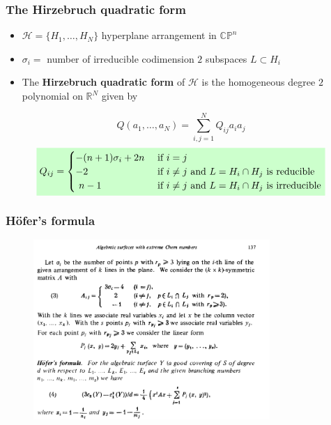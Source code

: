 \documentclass{beamer}
\newcommand{\R}{\mathbb{R}}
\newcommand{\CP}{\mathbb{CP}}
\newcommand{\mH}{\mathcal{H}}
\newcommand{\mathcolorbox}[2]{\colorbox{#1}{$\displaystyle #2$}}
\begin{document}
\begin{frame}
	\frametitle{The Hirzebruch quadratic form}
	\begin{itemize}
		\pause
		\item \(\mH = \{H_1, \ldots, H_N\}\) hyperplane arrangement in \(\CP^n\)
		\pause
		\item \(\sigma_i = \) number of irreducible codimension \(2\) subspaces \(L \subset H_i\)
		\pause
		\item The \textbf{Hirzebruch quadratic form} of \(\mH\) is the homogeneous degree \(2\) polynomial on \(\R^N\) given by
	\end{itemize}
	\[
	Q(a_1, \ldots, a_N) = \sum_{i,j = 1}^N Q_{ij} a_i a_j 
	\]
	\[
	\mathcolorbox{green!20}{
	Q_{ij} = \begin{cases}
		- (n+1) \sigma_i + 2n &\text{ if } i = j  \\
		-2 &\text{ if }  i \neq j \text{ and } L = H_i \cap H_j \text{ is reducible} \\
		\,\, n-1 &\text{ if } i \neq j \text{ and } L = H_i \cap H_j \text{ is irreducible} 
	\end{cases}
}
	\]
\end{frame}


\begin{frame}
	\frametitle{H\"ofer's formula}
	\begin{center}
		\begin{figure}
			\includegraphics[width=0.8\textwidth,height=0.8\textheight,keepaspectratio]{hofer}
		\end{figure}
	\end{center}
\end{frame}
\end{document}
